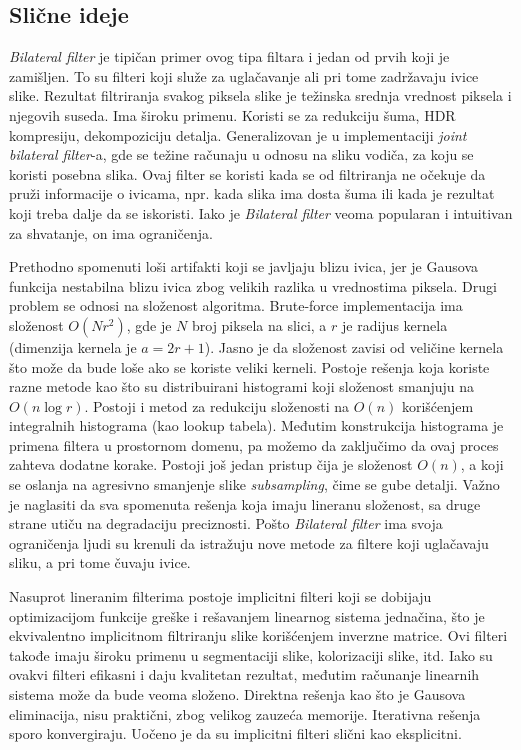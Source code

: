 \documentclass[a4paper,12pt,titlepage]{article}
\begin{document}
\subsection{Slične ideje}\label{4.2}%

\emph{Bilateral filter} je tipičan primer ovog tipa filtara i jedan od prvih koji je zamišljen. To su filteri koji služe za uglačavanje ali pri tome zadržavaju ivice slike. Rezultat filtriranja svakog piksela slike je težinska srednja vrednost piksela i njegovih suseda. Ima široku primenu. Koristi se za redukciju šuma, HDR kompresiju, dekompoziciju detalja. Generalizovan je u implementaciji \emph{joint bilateral filter}-a, gde se težine računaju u odnosu na sliku vodiča, za koju se koristi posebna slika. Ovaj filter se koristi kada se od filtriranja ne očekuje da pruži informacije o ivicama, npr. kada slika ima dosta šuma ili kada je rezultat koji treba dalje da se iskoristi. Iako je \emph{Bilateral filter} veoma popularan i intuitivan za shvatanje, on ima ograničenja. 

Prethodno spomenuti loši artifakti koji se javljaju blizu ivica, jer je Gausova funkcija nestabilna blizu ivica zbog velikih razlika u vrednostima piksela. Drugi problem se odnosi na složenost algoritma. Brute-force implementacija ima složenost $O(Nr^2)$, gde je $N$ broj piksela na slici, a $r$ je radijus kernela (dimenzija kernela je $a = 2r + 1$). Jasno je da složenost zavisi od veličine kernela što može da bude loše ako se koriste veliki kerneli. Postoje rešenja koja koriste razne metode kao što su distribuirani histogrami koji složenost smanjuju na $O(n \log{r})$. Postoji i metod za redukciju složenosti na $O(n)$ korišćenjem integralnih histograma (kao lookup tabela). Međutim konstrukcija histograma je primena filtera u prostornom domenu, pa možemo da zaključimo da ovaj proces zahteva dodatne korake. Postoji još jedan pristup čija je složenost $O(n)$, a koji se oslanja na agresivno smanjenje slike \emph{subsampling}, čime se gube detalji. Važno je naglasiti da sva spomenuta rešenja koja imaju lineranu složenost, sa druge strane utiču na degradaciju preciznosti. Pošto \emph{Bilateral filter} ima svoja ograničenja ljudi su krenuli da istražuju nove metode za filtere koji uglačavaju sliku, a pri tome čuvaju ivice. 

Nasuprot lineranim filterima postoje implicitni filteri koji se dobijaju optimizacijom funkcije greške i rešavanjem linearnog sistema jednačina, što je ekvivalentno implicitnom filtriranju slike korišćenjem inverzne matrice. Ovi filteri takođe imaju široku primenu u segmentaciji slike, kolorizaciji slike, itd. Iako su ovakvi filteri efikasni i daju kvalitetan rezultat, međutim računanje linearnih sistema može da bude veoma složeno. Direktna rešenja kao što je Gausova eliminacija, nisu praktični, zbog velikog zauzeća memorije. Iterativna rešenja sporo konvergiraju. Uočeno je da su implicitni filteri slični kao eksplicitni. 
\end{document}
